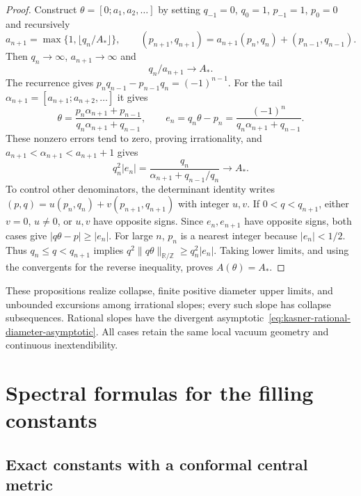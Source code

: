 \documentclass[10pt,a4paper]{article}
\numberwithin{equation}{section}
\theoremstyle{definition}
\theoremstyle{remark}
\newcommand{\R}{\mathbb R}
\begin{document}
\begin{proof}
Construct $\theta=[0;a_1,a_2,\ldots]$ by setting
$q_{-1}=0$, $q_0=1$, $p_{-1}=1$, $p_0=0$ and recursively
\[
 a_{n+1}=\max\{1,\lfloor q_n/A_*\rfloor\},\qquad
 (p_{n+1},q_{n+1})=a_{n+1}(p_n,q_n)+(p_{n-1},q_{n-1}).
\]
Then $q_n\to\infty$, $a_{n+1}\to\infty$ and
\begin{equation}
 q_n/a_{n+1}\longrightarrow A_*.
 \label{eq:kasner-cf-digit-choice}
\end{equation}
The recurrence gives
$p_nq_{n-1}-p_{n-1}q_n=(-1)^{n-1}$.
For the tail $\alpha_{n+1}=[a_{n+1};a_{n+2},\ldots]$ it gives
\[
 \theta=\frac{p_n\alpha_{n+1}+p_{n-1}}
 {q_n\alpha_{n+1}+q_{n-1}},\qquad
 e_n=q_n\theta-p_n=\frac{(-1)^n}{q_n\alpha_{n+1}+q_{n-1}}.
\]
These nonzero errors tend to zero, proving irrationality, and
$a_{n+1}<\alpha_{n+1}<a_{n+1}+1$ gives
\begin{equation}
 q_n^2|e_n|=\frac{q_n}{\alpha_{n+1}+q_{n-1}/q_n}
 \longrightarrow A_*.
 \label{eq:kasner-cf-error-limit}
\end{equation}
To control other denominators, the determinant identity writes
$(p,q)=u(p_n,q_n)+v(p_{n+1},q_{n+1})$ with integer $u,v$.
If $0<q<q_{n+1}$, either $v=0$, $u\ne0$, or $u,v$ have
opposite signs.  Since $e_n,e_{n+1}$ have opposite signs, both
cases give $|q\theta-p|\ge|e_n|$.
For large $n$, $p_n$ is a nearest integer because $|e_n|<1/2$.
Thus $q_n\le q<q_{n+1}$ implies
$q^2\|q\theta\|_{\R/\mathbb Z}\ge q_n^2|e_n|$.
Taking lower limits, and using the convergents for the reverse
inequality, proves $A(\theta)=A_*$.
\end{proof}

These propositions realize collapse, finite positive diameter upper
limits, and unbounded excursions among irrational slopes; every such
slope has collapse subsequences.  Rational slopes have the divergent
asymptotic~\eqref{eq:kasner-rational-diameter-asymptotic}.
All cases retain the same local vacuum geometry and continuous
inextendibility.

\section{Spectral formulas for the filling constants}
\label{app:area-spectrum}

\subsection{Exact constants with a conformal central metric}
\label{subsec:conformal-central-spectrum}
\end{document}
